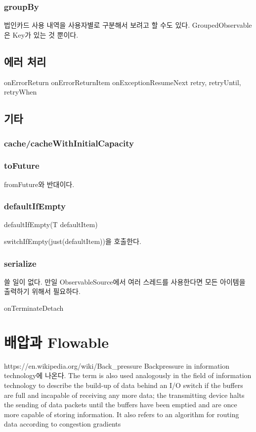 \documentclass{book}
\begin{document}
{\subsection{groupBy}
법인카드 사용 내역을 사용자별로 구분해서 보려고 할 수도 있다.
GroupedObservable은 Key가 있는 것 뿐이다.

\section{에러 처리}
onErrorReturn
onErrorReturnItem
onExceptionResumeNext
retry, retryUntil, retryWhen

\section{기타}
\subsection{cache/cacheWithInitialCapacity}
\subsection{toFuture}
fromFuture와 반대이다.

\subsection{defaultIfEmpty}
defaultIfEmpty(T defaultItem)

switchIfEmpty(just(defaultItem))을 호출한다.

\subsection{serialize}
쓸 일이 없다. 만일 ObservableSource에서 여러 스레드를 사용한다면 모든 아이템을 출력하기 위해서 필요하다.

onTerminateDetach


\chapter{배압과 Flowable}
https://en.wikipedia.org/wiki/Back_pressure
Backpressure in information technology에 나온다.
The term is also used analogously in the field of information technology to describe the build-up of data behind an I/O switch if the buffers are full and incapable of receiving any more data; the transmitting device halts the sending of data packets until the buffers have been emptied and are once more capable of storing information. It also refers to an algorithm for routing data according to congestion gradients

}
\end{document}
